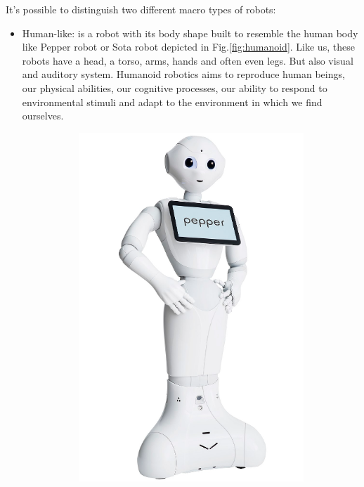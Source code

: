\documentclass{thesisreport}
\begin{document}
It's possible to distinguish two different macro types of robots:
\begin{itemize}
\item Human-like: is a robot with its body shape built to resemble the human body like Pepper robot \cite{pepper} or Sota robot \cite{nttData} depicted in Fig.\ref{fig:humanoid}. Like us, these robots have a head, a torso, arms, hands and often even legs. But also visual and auditory system. Humanoid robotics aims to reproduce human beings, our physical abilities, our cognitive processes, our ability to respond to environmental stimuli and adapt to the environment in which we find ourselves. 
\begin{figure}[H]
	\centering
	\begin{subfigure}{0.27\textwidth}
	    \includegraphics[width=\textwidth]{Thesis/data/pepper.png}

\end{subfigure}
\end{figure}
\end{itemize}
\end{document}
